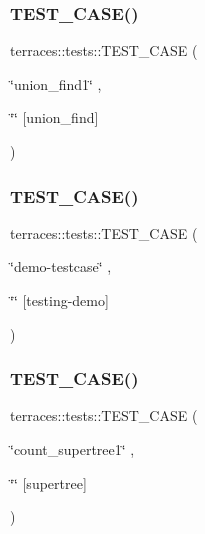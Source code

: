 \subsubsection{\texorpdfstring{T\+E\+S\+T\+\_\+\+C\+A\+S\+E()}{TEST\_CASE()}\hspace{0.1cm}{\footnotesize\ttfamily [6/78]}}
{\footnotesize\ttfamily terraces\+::tests\+::\+T\+E\+S\+T\+\_\+\+C\+A\+SE (\begin{DoxyParamCaption}\item[{\char`\"{}union\+\_\+find1\char`\"{}}]{,  }\item[{\char`\"{}\char`\"{}}]{\mbox{[}union\+\_\+find\mbox{]} }\end{DoxyParamCaption})}

\mbox{\label{namespaceterraces_1_1tests_a6192f735c7a0b588edcaad99a9d56d75}} 
\subsubsection{\texorpdfstring{T\+E\+S\+T\+\_\+\+C\+A\+S\+E()}{TEST\_CASE()}\hspace{0.1cm}{\footnotesize\ttfamily [7/78]}}
{\footnotesize\ttfamily terraces\+::tests\+::\+T\+E\+S\+T\+\_\+\+C\+A\+SE (\begin{DoxyParamCaption}\item[{\char`\"{}demo-\/testcase\char`\"{}}]{,  }\item[{\char`\"{}\char`\"{}}]{\mbox{[}testing-\/demo\mbox{]} }\end{DoxyParamCaption})}

\mbox{\label{namespaceterraces_1_1tests_a74e1768d2010ba771df04a9f6a1493f8}} 
\subsubsection{\texorpdfstring{T\+E\+S\+T\+\_\+\+C\+A\+S\+E()}{TEST\_CASE()}\hspace{0.1cm}{\footnotesize\ttfamily [8/78]}}
{\footnotesize\ttfamily terraces\+::tests\+::\+T\+E\+S\+T\+\_\+\+C\+A\+SE (\begin{DoxyParamCaption}\item[{\char`\"{}count\+\_\+supertree1\char`\"{}}]{,  }\item[{\char`\"{}\char`\"{}}]{\mbox{[}supertree\mbox{]} }\end{DoxyParamCaption})}

